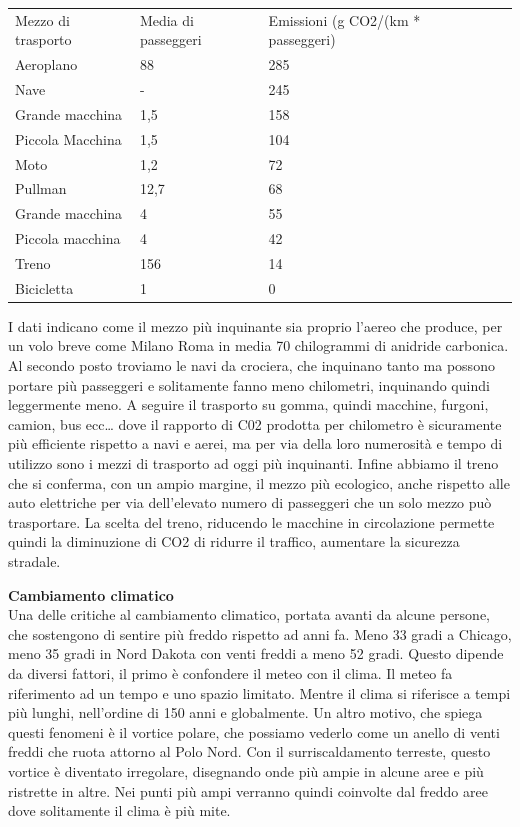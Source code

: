\documentclass[12pt]{book} %
\begin{document}
\begin{table}[]
\begin{tabular}{lllll}
Mezzo di trasporto & Media di passeggeri & Emissioni (g CO2/(km * passeggeri) & & \\
Aeroplano & 88 & 285 & & \\
Nave & - & 245 & & \\
Grande macchina & 1,5 & 158 & & \\
Piccola Macchina & 1,5 & 104 & & \\
Moto & 1,2 & 72 & & \\
Pullman & 12,7 & 68 & & \\
Grande macchina & 4 & 55 & & \\
Piccola macchina & 4 & 42 & & \\
Treno & 156 & 14 & & \\
Bicicletta & 1 & 0 & & 
\end{tabular}
\end{table}

\bigskip

I dati indicano come il mezzo più
inquinante sia proprio l'aereo che produce, per un volo breve come Milano Roma in media 70
chilogrammi di anidride carbonica. Al secondo posto troviamo le navi da crociera, che inquinano tanto ma possono
portare più passeggeri e solitamente fanno meno chilometri, inquinando quindi leggermente meno. A seguire il trasporto
su gomma, quindi macchine, furgoni, camion, bus ecc… dove il rapporto di C02 prodotta per chilometro è sicuramente più
efficiente rispetto a navi e aerei, ma per via della loro numerosità e tempo di utilizzo sono i mezzi di trasporto ad
oggi più inquinanti. Infine abbiamo il treno che si conferma, con un ampio margine, il mezzo più ecologico, anche
rispetto alle auto elettriche per via dell'elevato numero di passeggeri che un solo mezzo può
trasportare. 
La scelta del treno, riducendo le macchine in circolazione permette quindi la diminuzione di CO2 di ridurre il
traffico, aumentare la sicurezza stradale.

\noindent \textbf{\large Cambiamento climatico} \\
Una delle critiche al cambiamento climatico, portata avanti da alcune persone, che sostengono di sentire più freddo rispetto ad anni fa. 
Meno 33 gradi a Chicago, meno 35 gradi in Nord
Dakota con venti freddi a meno 52 gradi. Questo dipende da diversi fattori, il primo è confondere il meteo con il clima. Il meteo fa riferimento ad un tempo e uno spazio limitato. Mentre il clima si riferisce a tempi più lunghi,
nell'ordine di 150 anni e globalmente. Un altro motivo, che spiega questi fenomeni è il vortice polare, che possiamo vederlo come
un anello di venti freddi che ruota attorno al Polo Nord. Con il surriscaldamento terreste, questo vortice è diventato
irregolare, disegnando onde più ampie in alcune aree e più ristrette in altre. Nei punti più ampi verranno quindi
coinvolte dal freddo aree dove solitamente il clima è più mite. 
\end{document}

